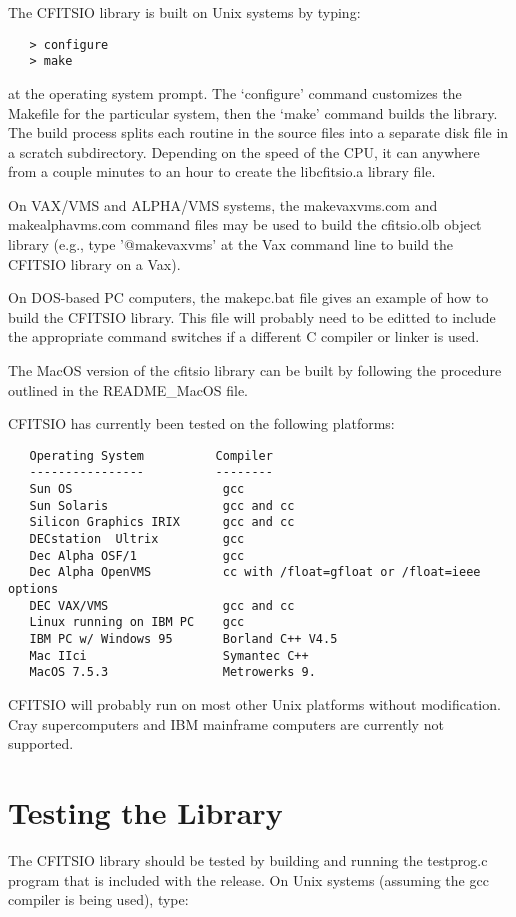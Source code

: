 The CFITSIO library is built on Unix systems by typing:

\begin{verbatim}
   > configure
   > make
\end{verbatim}
at the operating system prompt.  The `configure' command customizes
the Makefile for the particular system, then the `make' command
builds the library.  The build process splits each routine in the
source files into a separate disk file in a scratch subdirectory.
Depending on the speed of the CPU, it can anywhere from a couple
minutes to an hour to create the libcfitsio.a library file.

On VAX/VMS and ALPHA/VMS systems, the makevaxvms.com and makealphavms.com
command files may be used to build the cfitsio.olb object library
(e.g., type '@makevaxvms' at the Vax command line to build the CFITSIO
library on a Vax).

On DOS-based PC computers, the makepc.bat file gives an example
of how to build the CFITSIO library.  This file will probably
need to be editted to include the appropriate command switches
if a different C compiler or linker is used.

The MacOS version of the cfitsio library can be built by following
the procedure outlined in the README\_MacOS file.

CFITSIO has currently been tested on the following platforms:

\begin{verbatim}
   Operating System          Compiler
   ----------------          --------
   Sun OS                     gcc
   Sun Solaris                gcc and cc
   Silicon Graphics IRIX      gcc and cc
   DECstation  Ultrix         gcc
   Dec Alpha OSF/1            gcc
   Dec Alpha OpenVMS          cc with /float=gfloat or /float=ieee options
   DEC VAX/VMS                gcc and cc
   Linux running on IBM PC    gcc
   IBM PC w/ Windows 95       Borland C++ V4.5
   Mac IIci                   Symantec C++
   MacOS 7.5.3                Metrowerks 9.
\end{verbatim}
CFITSIO will probably run on most other Unix platforms without
modification.  Cray supercomputers and IBM mainframe computers are
currently not supported.


\section{Testing the Library}

The CFITSIO library should be tested by building and running
the testprog.c program that is included with the release.
On Unix systems (assuming the gcc compiler is being used), type:

